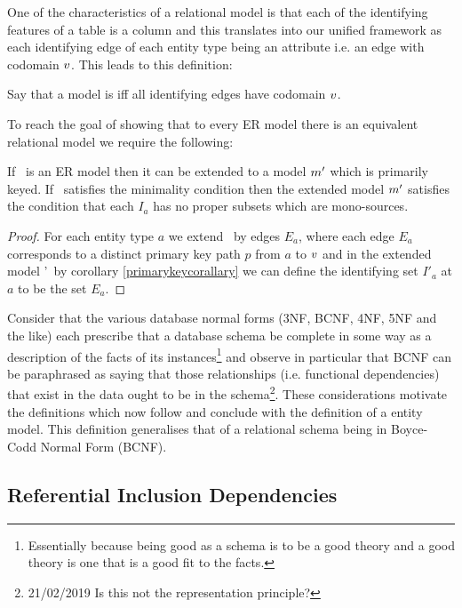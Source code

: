 One of the characteristics of a relational model is that each of the identifying features of a table is a column
and this translates into our unified framework as each identifying edge of each entity type being an attribute i.e. 
an edge with codomain $v$. This leads to this definition: 
\begin{definition}
Say that a model is  iff all identifying edges 
have codomain $v$.
\end{definition}
To reach the goal of showing that to every ER model there is an equivalent relational model we require the following:
\begin{lemma}
If \genericmodel\ is an ER model then it can be extended to a model ${m}'$
which is primarily keyed. If \genericmodel\ satisfies the minimality condition then the
extended model ${m}'$ satisfies the  condition that each $I_a$ has no proper subsets which
are mono-sources. 
\end{lemma}
\begin{proof}
For each entity type $a$ we extend \genericmodel\ by edges $E_a$, where each edge 
$E_a$ corresponds to a distinct primary key path $p$ from $a$ to $v$
and in the extended model \genericmodel'\ by corollary \ref{primarykeycorallary} 
we can define the identifying set $I'_a$ at $a$ to be the set
$E_a$. 
\end{proof}




\noindent
Consider that the various database normal forms (3NF, BCNF, 4NF, 5NF and the like) each 
prescribe that a database schema be complete in some way as a description of the facts of its instances\footnote{Essentially
 because being good as a schema is to be a good theory and a good theory is one that is a good fit to the facts.} and observe 
in particular that BCNF can be paraphrased as saying that those relationships (i.e. functional dependencies) that exist in the data ought to be  in the schema\footnote{21/02/2019 Is this not the representation principle?}. These considerations motivate the definitions which now follow and conclude with the definition of a  entity model. This definition generalises that of a relational schema being in Boyce-Codd Normal Form (BCNF). 


\subsection{Referential Inclusion Dependencies}

